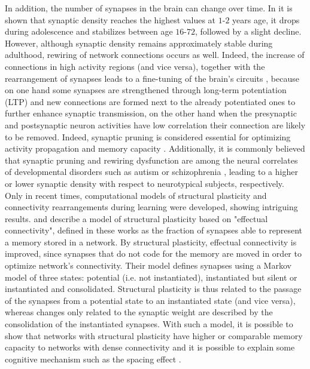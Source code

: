 \documentclass[a4paper, 12pt, twoside, openright]{book}
\begin{document}
In addition, the number of synapses in the brain can change over time. In \cite{Huttenlocher1979} it is shown that synaptic density reaches the highest values at $1$-$2$ years age, it drops during adolescence and stabilizes between age $16$-$72$, followed by a slight decline. However, although synaptic density remains approximately stable during adulthood, rewiring of network connections occurs as well. Indeed, the increase of connections in high activity regions (and vice versa), together with the rearrangement of synapses leads to a fine-tuning of the brain's circuits \cite{sakai2020}, because on one hand some synapses are strengthened through long-term potentiation (LTP) and new connections are formed next to the already potentiated ones to further enhance synaptic transmission, on the other hand when the presynaptic and postsynaptic neuron activities have low correlation their connection are likely to be removed. Indeed, synaptic pruning is considered essential for optimizing activity propagation and memory capacity \cite{Chklovskii2004, Knoblauch2014, Knoblauch2016}.
Additionally, it is commonly believed that synaptic pruning and rewiring dysfunction are among the neural correlates of developmental disorders such as autism or schizophrenia \cite{Bourgeron2009,Moyer2015}, leading to a higher or lower synaptic density with respect to neurotypical subjects, respectively\cite{Hutsler2010,Pagani2021,Glantz2000}.\\
Only in recent times, computational models of structural plasticity and connectivity rearrangements during learning were developed, showing intriguing results. \cite{Knoblauch2014} and \cite{Knoblauch2016} describe a model of structural plasticity based on "effectual connectivity", defined in these works as the fraction of synapses able to represent a memory stored in a network. By structural plasticity, effectual connectivity is improved, since synapses that do not code for the memory are moved in order to optimize network's connectivity. Their model defines synapses using a Markov model of three states: potential (i.e. not instantiated), instantiated but silent or instantiated and consolidated. Structural plasticity is thus related to the passage of the synapses from a potential state to an instantiated state (and vice versa), whereas changes only related to the synaptic weight are described by the consolidation of the instantiated synapses. With such a model, it is possible to show that networks with structural plasticity have higher or comparable memory capacity to networks with dense connectivity and it is possible to explain some cognitive mechanism such as the spacing effect \cite{Knoblauch2014}.\\
\end{document}
